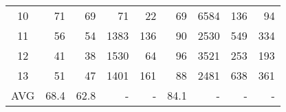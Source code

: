 \begin{table}
{{\begin{tabular}{c|r|r||r|r|r||r|r|r}
10 & 71 & 69 & 71 & 22 & 69 & 6584 & 136 & 94 \\ 

11 & 56 & 54 & 1383 & 136 & 90 & 2530 & 549 & 334 \\ 

12 & 41 & 38 & 1530 & 64 & 96 & 3521 & 253 & 193 \\ 

13 & 51 & 47 & 1401 & 161 & 88 & 2481 & 638 & 361 \\ \hline

AVG& 68.4 & 62.8 & - & - & 84.1 & - & - & - \\  \hline
          
\hline\end{tabular}\centering
            }
}
\vspace{-0.18in}
\end{table}


